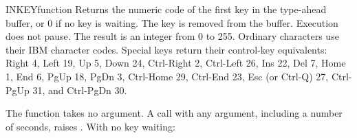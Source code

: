 \begin{XbaseEntry}{INKEY}{function}
Returns the numeric code of the first key in the type-ahead buffer, or 0 if
no key is waiting. The key is removed from the buffer. Execution does not pause.
\Syntax
{}
\Usage
The result is an integer from 0 to 255. Ordinary characters use their IBM
character codes. Special keys return their control-key equivalents: Right 4,
Left 19, Up 5, Down 24, Ctrl-Right 2, Ctrl-Left 26, Ins 22, Del 7,
Home 1, End 6, PgUp 18, PgDn 3, Ctrl-Home 29, Ctrl-End 23,
Esc (or Ctrl-Q) 27, Ctrl-PgUp 31, and Ctrl-PgDn 30.

The function takes no argument. A call with any argument, including a
number of seconds, raises .
\Examples
With no key waiting:
\end{XbaseEntry}

